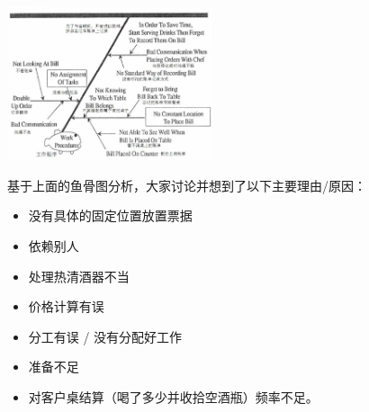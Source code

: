 
\includegraphics[width=6cm]{club151.jpg}

基于上面的鱼骨图分析，大家讨论并想到了以下主要理由/原因：

\begin{itemize}
\tightlist
\item
  没有具体的固定位置放置票据
\end{itemize}

\begin{itemize}
\tightlist
\item
  依赖别人
\end{itemize}

\begin{itemize}
\tightlist
\item
  处理热清酒器不当
\end{itemize}

\begin{itemize}
\tightlist
\item
  价格计算有误
\end{itemize}

\begin{itemize}
\tightlist
\item
  分工有误 / 没有分配好工作
\end{itemize}

\begin{itemize}
\tightlist
\item
  准备不足
\end{itemize}

\begin{itemize}
\tightlist
\item
  对客户桌结算（喝了多少并收拾空酒瓶）频率不足。
\end{itemize}


